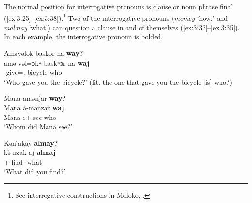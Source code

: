 \begin{table}
\caption{Interrogative pronouns\label{tab:3.19}}
\end{table}

\clearpage
The normal position for interrogative pronouns is clause or noun phrase final (\ref{ex:3:25}--\ref{ex:3:38}).\footnote{See interrogative constructions in Moloko, .}  Two of the interrogative pronouns (\textit{memey} ‘how,’ and \textit{malmay} ‘what’) can question a clause in and of themselves (\ref{ex:3:33}--\ref{ex:3:35}). In each example, the interrogative pronoun is bolded. 

\ea \label{ex:3:25}
Aməvəlok  baskor  na  \textbf{way?}\\
\gll  amə-vəl=ɔkʷ baskʷɔr   na   \textbf{waj}\\
      {\DEP}-give={\twoS}.{\IO}  bicycle  {\PSP}  who\\
\glt  ‘Who gave you the bicycle?’ (lit. the one that gave you the bicycle [is] who?)
\z

\ea \label{ex:3:26}
Mana  amənjar  \textbf{way?}\\
\gll  Mana   à-mənzar   \textbf{waj}\\
      Mana  \textsc{s}+{\PFV}-see  who\\
\glt  ‘Whom did Mana see?’
\z

\ea \label{ex:3:27}
Kənjakay  \textbf{almay?}\\
\gll  k\`{ə}-nzak-aj    \textbf{almaj}\\
      {\twoS}+{\PFV}-find-{\CL}  what\\
\glt  ‘What did you find?’
\z

